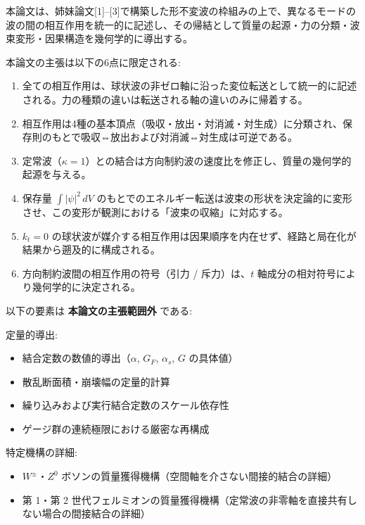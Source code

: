 \documentclass[
  a4paper,11pt]{ltjsarticle}
\providecommand{\tightlist}{%
  \setlength{\itemsep}{0pt}\setlength{\parskip}{0pt}}
\theoremstyle{definition}
\theoremstyle{remark}
\begin{document}
本論文は、姉妹論文{[}1{]}--{[}3{]}で構築した形不変波の枠組みの上で、異なるモードの波の間の相互作用を統一的に記述し、その帰結として質量の起源・力の分類・波束変形・因果構造を幾何学的に導出する。

本論文の主張は以下の6点に限定される:

\begin{enumerate}
\def\labelenumi{\arabic{enumi}.}
\tightlist
\item
  全ての相互作用は、球状波の非ゼロ軸に沿った変位転送として統一的に記述される。力の種類の違いは転送される軸の違いのみに帰着する。
\item
  相互作用は4種の基本頂点（吸収・放出・対消滅・対生成）に分類され、保存則のもとで吸収⇔放出および対消滅⇔対生成は可逆である。
\item
  定常波（\(\kappa = 1\)）との結合は方向制約波の速度比を修正し、質量の幾何学的起源を与える。
\item
  保存量 \(\int |\psi|^2 \, dV\)
  のもとでのエネルギー転送は波束の形状を決定論的に変形させ、この変形が観測における「波束の収縮」に対応する。
\item
  \(k_t = 0\)
  の球状波が媒介する相互作用は因果順序を内在せず、経路と局在化が結果から遡及的に構成される。
\item
  方向制約波間の相互作用の符号（引力 / 斥力）は、\(t\)
  軸成分の相対符号により幾何学的に決定される。
\end{enumerate}

以下の要素は \textbf{本論文の主張範囲外} である:

定量的導出:

\begin{itemize}
\tightlist
\item
  結合定数の数値的導出（\(\alpha\), \(G_F\), \(\alpha_s\), \(G\)
  の具体値）
\item
  散乱断面積・崩壊幅の定量的計算
\item
  繰り込みおよび実行結合定数のスケール依存性
\item
  ゲージ群の連続極限における厳密な再構成
\end{itemize}

特定機構の詳細:

\begin{itemize}
\tightlist
\item
  \(W^{\pm}\)・\(Z^0\)
  ボソンの質量獲得機構（空間軸を介さない間接的結合の詳細）
\item
  第 1・第 2
  世代フェルミオンの質量獲得機構（定常波の非零軸を直接共有しない場合の間接結合の詳細）
\end{itemize}
\end{document}
